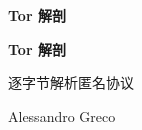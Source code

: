 \documentclass[11pt,openright,twoside]{book}
\begin{document}
\frontmatter
\thispagestyle{empty}
\null\vfill
\begin{center}{\LARGE\bfseries Tor 解剖\par}\end{center}
\vfill\vfill
\cleardoublepage
\thispagestyle{empty}
\begin{center}
\vspace*{2.5cm}
{\Huge\bfseries Tor 解剖\par}
\vspace{0.9cm}
{\Large 逐字节解析匿名协议\par}
\vspace{3.5cm}
{\Large Alessandro Greco\par}
\vfill
\end{center}
\clearpage
\thispagestyle{empty}
\null\vfill
\Colophon
\cleardoublepage
\tableofcontents

\mainmatter

\backmatter
\printbibliography[heading=bibintoc,title={参考文献}]
\printindex
\end{document}

